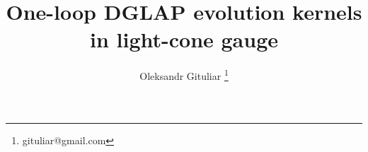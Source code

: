 \documentclass[10pt,pagesize,paper=A4]{scrartcl}
\begin{document}
  \author{Oleksandr Gituliar \thanks{gituliar@gmail.com}}
  \title{One-loop DGLAP evolution kernels in light-cone gauge}

  \maketitle
\end{document}
